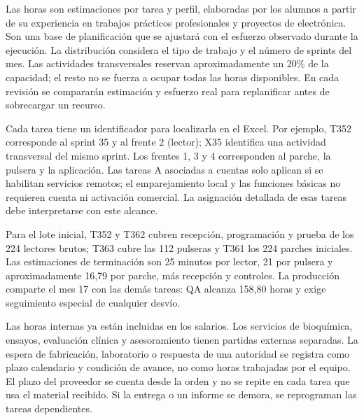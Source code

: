 Las horas son estimaciones por tarea y perfil, elaboradas por los alumnos a partir de su experiencia en trabajos prácticos profesionales y proyectos de electrónica. Son una base de planificación que se ajustará con el esfuerzo observado durante la ejecución. La distribución considera el tipo de trabajo y el número de sprints del mes. Las actividades transversales reservan aproximadamente un 20\% de la capacidad; el resto no se fuerza a ocupar todas las horas disponibles. En cada revisión se compararán estimación y esfuerzo real para replanificar antes de sobrecargar un recurso.

Cada tarea tiene un identificador para localizarla en el Excel. Por ejemplo, T352 corresponde al sprint 35 y al frente 2 (lector); X35 identifica una actividad transversal del mismo sprint. Los frentes 1, 3 y 4 corresponden al parche, la pulsera y la aplicación. Las tareas A asociadas a cuentas solo aplican si se habilitan servicios remotos; el emparejamiento local y las funciones básicas no requieren cuenta ni activación comercial. La asignación detallada de esas tareas debe interpretarse con este alcance.

Para el lote inicial, T352 y T362 cubren recepción, programación y prueba de los 224 lectores brutos; T363 cubre las 112 pulseras y T361 los 224 parches iniciales. Las estimaciones de terminación son 25 minutos por lector, 21 por pulsera y aproximadamente 16,79 por parche, más recepción y controles. La producción comparte el mes 17 con las demás tareas: QA alcanza 158,80 horas y exige seguimiento especial de cualquier desvío.

Las horas internas ya están incluidas en los salarios. Los servicios de bioquímica, ensayos, evaluación clínica y asesoramiento tienen partidas externas separadas. La espera de fabricación, laboratorio o respuesta de una autoridad se registra como plazo calendario y condición de avance, no como horas trabajadas por el equipo. El plazo del proveedor se cuenta desde la orden y no se repite en cada tarea que usa el material recibido. Si la entrega o un informe se demora, se reprograman las tareas dependientes.

